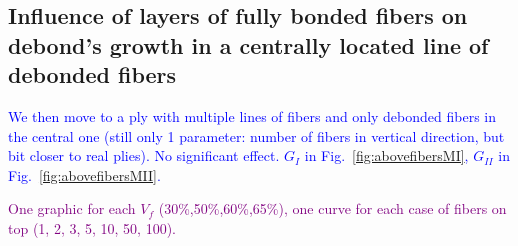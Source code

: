 \documentclass[review]{elsarticle}
\begin{document}
\subsection{Influence of layers of fully bonded fibers on debond's growth in a centrally located line of debonded fibers}

\textcolor{blue}{We then move to a ply with multiple lines of fibers and only debonded fibers in the central one (still only 1 parameter: number of fibers in vertical direction, but bit closer to real plies). No significant effect.  $G_{I}$ in Fig.~\ref{fig:abovefibersMI}, $G_{II}$ in Fig.~\ref{fig:abovefibersMII}.}

\textcolor{purple}{One graphic for each $V_{f}$ (30\%,50\%,60\%,65\%), one curve for each case of fibers on top (1, 2, 3, 5, 10, 50, 100).}\\
\end{document}
